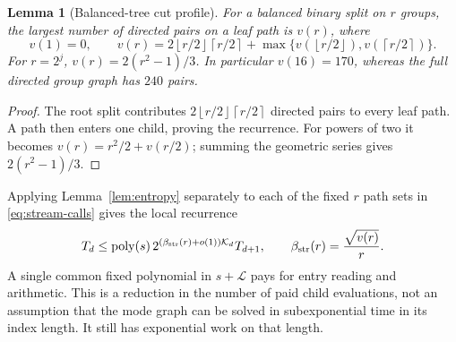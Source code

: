 \documentclass[11pt]{article}
\newtheorem{lemma}[theorem]{Lemma}
\theoremstyle{definition}\newtheorem{definition}[theorem]{Definition}
\theoremstyle{remark}\newtheorem{remark}[theorem]{Remark}
\newcommand{\poly}{\operatorname{poly}}
\newcommand{\floor}[1]{\left\lfloor#1\right\rfloor}
\newcommand{\ceil}[1]{\left\lceil#1\right\rceil}
\newcommand{\K}{\mathcal K}
\begin{document}
\begin{lemma}[Balanced-tree cut profile]\label{lem:stream-profile}
For a balanced binary split on $r$ groups, the largest number of directed
pairs on a leaf path is $v(r)$, where
\begin{equation}
 v(1)=0,\qquad
 v(r)=2\floor{r/2}\ceil{r/2}
       +\max\{v(\floor{r/2}),v(\ceil{r/2})\}.
 \label{eq:v-rec}
\end{equation}
For $r=2^j$, $v(r)=2(r^2-1)/3$. In particular $v(16)=170$, whereas the
full directed group graph has $240$ pairs.
\end{lemma}
\begin{proof}
The root split contributes $2\floor{r/2}\ceil{r/2}$ directed pairs to every
leaf path. A path then enters one child, proving the recurrence. For powers
of two it becomes $v(r)=r^2/2+v(r/2)$; summing the geometric series gives
$2(r^2-1)/3$.
\end{proof}

Applying Lemma~\ref{lem:entropy} separately to each of the fixed $r$ path
sets in \eqref{eq:stream-calls} gives the local recurrence
\begin{equation}
 T_d\le\poly(s)\,
 2^{(\beta_{\rm str}(r)+o(1))\K_d}T_{d+1},\qquad
 \beta_{\rm str}(r)=\frac{\sqrt{v(r)}}r.
 \label{eq:stream-rec}
\end{equation}
A single common fixed polynomial in $s+\mathcal L$ pays for entry reading
and arithmetic. This is a reduction in the number of paid child evaluations,
not an assumption that the mode graph can be solved in subexponential time
in its index length. It still has exponential work on that length.
\end{document}
